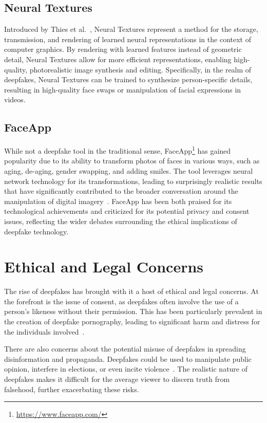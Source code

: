 \subsection{Neural Textures}
Introduced by Thies et al.~\cite{thies2019deferred}, Neural Textures represent
a method for the storage, transmission, and rendering of learned
neural representations in the context of computer graphics.
By rendering with learned features instead of geometric detail, Neural
Textures allow for more efficient representations, enabling high-quality,
photorealistic image synthesis and editing. Specifically, in the realm of
deepfakes, Neural Textures can be trained to synthesize person-specific
details, resulting in high-quality face swaps or manipulation of facial
expressions in videos.

\subsection{FaceApp}
While not a deepfake tool in the traditional sense,
FaceApp\footnote{\url{https://www.faceapp.com/}} has gained popularity due
to its ability to transform photos of faces in various ways, such as aging,
de-aging, gender swapping, and adding smiles. The tool leverages neural
network technology for its transformations, leading to surprisingly
realistic results that have significantly contributed to the broader conversation
around the manipulation of digital imagery~\cite{faceapp}. FaceApp has
been both praised for its technological achievements and criticized for
its potential privacy and consent issues, reflecting the wider debates
surrounding the ethical implications of deepfake technology.


\section{Ethical and Legal Concerns}\label{chapter:legal}
The rise of deepfakes has brought with it a host of ethical and legal concerns.
At the forefront is the issue of consent, as deepfakes often involve the
use of a person's likeness without their permission. This has been
particularly prevalent in the creation of deepfake pornography, leading
to significant harm and distress for the individuals involved~\cite{chesney2019deep}.

There are also concerns about the potential misuse of deepfakes in spreading
disinformation and propaganda. Deepfakes could be used to manipulate public
opinion, interfere in elections, or even incite violence~\cite{deepfakes-business-insider,partnershiponai}.
The realistic nature of deepfakes makes it difficult for the average viewer
to discern truth from falsehood, further exacerbating these risks.

